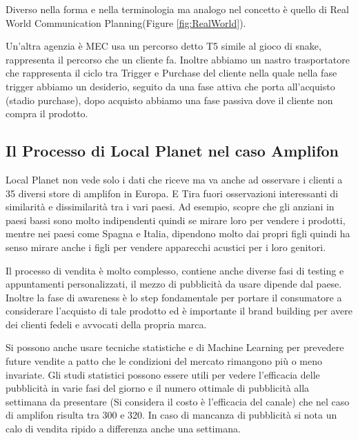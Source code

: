 \documentclass[11pt]{article}
\begin{document}
Diverso nella forma e nella terminologia ma analogo nel concetto è quello di Real World Communication Planning(Figure \ref{fig:RealWorld}).


Un'altra agenzia è MEC usa un percorso detto T5 simile al gioco di snake, rappresenta il percorso che un cliente fa. 
Inoltre abbiamo un nastro trasportatore che rappresenta il ciclo tra Trigger e Purchase del cliente nella quale nella fase trigger abbiamo un desiderio, seguito da una fase attiva che porta all'acquisto (stadio purchase), dopo acquisto abbiamo una fase passiva dove il cliente non compra il prodotto.

\subsection{Il Processo di Local Planet nel caso Amplifon}
Local Planet non vede solo i dati che riceve ma va anche ad osservare i clienti a 35 diversi store di amplifon in Europa.
E Tira fuori osservazioni interessanti di similarità e dissimilarità tra i vari paesi. 
Ad esempio, scopre che gli anziani in paesi bassi sono molto indipendenti quindi se mirare loro per vendere i prodotti, mentre nei paesi come Spagna e Italia, dipendono molto dai propri figli quindi ha senso mirare anche i figli per vendere apparecchi acustici per i loro genitori.

Il processo di vendita è molto complesso, contiene anche diverse fasi di testing e appuntamenti personalizzati, il mezzo di pubblicità da usare dipende dal paese. 
Inoltre la fase di awareness è lo step fondamentale per portare il consumatore a considerare l'acquisto di tale prodotto ed è importante il brand building per avere dei clienti fedeli e avvocati della propria marca.

Si possono anche usare tecniche statistiche e di Machine Learning per prevedere future vendite a patto che le condizioni del mercato rimangono più o meno invariate. 
Gli studi statistici possono essere utili per vedere l'efficacia delle pubblicità in varie fasi del giorno e il numero ottimale di pubblicità alla settimana da presentare (Si considera il costo è l'efficacia del canale) che nel caso di amplifon risulta tra 300 e 320.
In caso di mancanza di pubblicità si nota un calo di vendita ripido a differenza anche una settimana.
\end{document}
